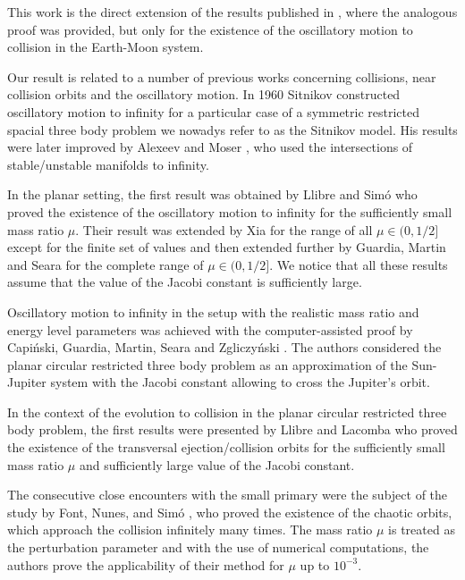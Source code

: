 \documentclass[1p]{article}
\begin{document}
This work is the direct extension of the results published in \cite{CAPINSKI2026109173}, where the analogous proof was provided, but only for the existence of the oscillatory motion to collision in the Earth-Moon system.

Our result is related to a number of previous works concerning collisions, near collision orbits and the oscillatory motion. In 1960 Sitnikov \cite{MR0127389} constructed oscillatory motion to infinity for a particular case of a symmetric restricted spacial three body problem we nowadys refer to as the Sitnikov model. His results were later improved by Alexeev \cite{VMAlekseev_1976} and Moser \cite{Moser01}, who used the intersections of stable/unstable manifolds to infinity.

In the planar setting, the first result was obtained by Llibre and Sim\'o \cite{SimoL80} who proved the existence of the oscillatory motion to infinity for the sufficiently small mass ratio $\mu$. Their result was extended by Xia \cite{XIA1992170} for the range of all $\mu \in (0,1/2]$ except for the finite set of values and then extended further by Guardia, Martin and Seara \cite{GuardiaMS16} for the complete range of $\mu \in (0,1/2]$. We notice that all these results \cite{SimoL80,XIA1992170,GuardiaMS16} assume that the value of the Jacobi constant is sufficiently large.

Oscillatory motion to infinity in the setup with the realistic mass ratio and energy level parameters was achieved with the computer-assisted proof by Capiński, Guardia, Martin, Seara and Zgliczyński \cite{MR4391693}. The authors considered the planar circular restricted three body problem as an approximation of the Sun-Jupiter system with the Jacobi constant allowing to cross the Jupiter's orbit.

In the context of the evolution to collision in the planar circular restricted three body problem, the first results were presented by Llibre and Lacomba \cite{llibre1982,LACOMBA198869} who proved the existence of the transversal ejection/collision orbits for the sufficiently small mass ratio $\mu$ and sufficiently large value of the Jacobi constant.

The consecutive close encounters with the small primary were the subject of the study by Font, Nunes, and Simó \cite{MR1877971,MR2475705}, who proved the existence of the chaotic orbits, which approach the collision infinitely many times. The mass ratio $\mu$ is treated as the perturbation parameter and with the use of numerical computations, the authors prove the applicability of their method for $\mu$ up to $10^{-3}$.
\end{document}
